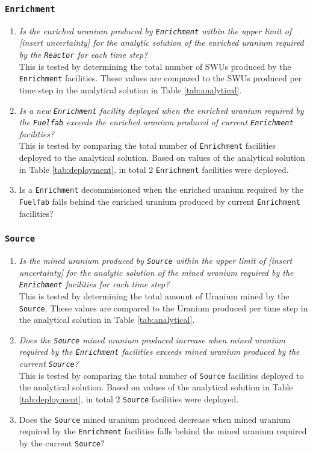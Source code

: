 \documentclass[12pt,letterpaper]{article}
\begin{document}
\subsubsection{\texttt{Enrichment}}
\begin{enumerate}
\item  \textit{Is the enriched uranium produced by \texttt{Enrichment} within the upper limit of [insert uncertainty] for the analytic solution of the enriched uranium required by the \texttt{Reactor} for each time step? } \\
This is tested by determining the total number of SWUs produced by the \texttt{Enrichment} facilities. These values are compared to the SWUs produced per time step in the analytical solution in Table \ref{tab:analytical}.
\item \textit{Is a new \texttt{Enrichment} facility deployed when the enriched uranium required by the \texttt{Fuelfab} exceeds the enriched uranium produced of current \texttt{Enrichment} facilities?} \\
This is tested by comparing the total number of \texttt{Enrichment} facilities deployed to the analytical solution. Based on values of the analytical solution in Table \ref{tab:deployment}, in total 2 \texttt{Enrichment} facilities were deployed.

\item Is a \texttt{Enrichment} decommissioned when the enriched uranium required by the \texttt{Fuelfab} falls behind the enriched uranium produced by current \texttt{Enrichment} facilities?
\end{enumerate}

\subsubsection{\texttt{Source}}
\begin{enumerate}
\item \textit{Is the mined uranium produced by \texttt{Source} within the upper limit of [insert uncertainty] for the analytic solution of the mined uranium required by the \texttt{Enrichment} facilities for each time step?} \\
This is tested by determining the total amount of Uranium mined by the \texttt{Source}. These values are compared to the Uranium produced per time step in the analytical solution in Table \ref{tab:analytical}.

\item \textit{Does the \texttt{Source} mined uranium produced increase when mined uranium required by the \texttt{Enrichment} facilities exceeds mined uranium produced by the current \texttt{Source}?} \\
This is tested by comparing the total number of \texttt{Source} facilities deployed to the analytical solution. Based on values of the analytical solution in Table \ref{tab:deployment}, in total 2 \texttt{Source} facilities were deployed.

\item Does the \texttt{Source} mined uranium produced decrease when mined uranium required by the \texttt{Enrichment} facilities falls behind the mined uranium required by the current \texttt{Source}?
\end{enumerate}
\end{document}
